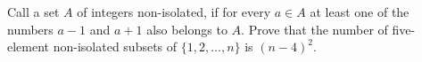 Call a set $A$ of integers non-isolated, if for every $a\in A$ at least one of the numbers $a-1$ and $a+1$ also belongs to $A$. Prove that the number of five-element non-isolated subsets of $\{1, 2,\ldots ,n\}$ is $(n-4)^2$.